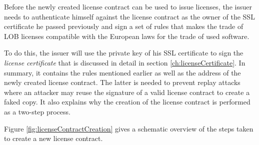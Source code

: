 \documentclass[a4paper]{article}
\begin{document}
Before the newly created license contract can be used to issue licenses, the issuer needs to authenticate himself against the license contract as the owner of the SSL certificate he passed previously and sign a set of rules that makes the trade of LOB licenses compatible with the European laws for the trade of used software.

To do this, the issuer will use the private key of his SSL certificate to sign the \emph{license certificate} that is discussed in detail in section \ref{ch:licenseCertificate}. In summary, it contains the rules mentioned earlier as well as the address of the newly created license contract. The latter is needed to prevent replay attacks where an attacker may reuse the signature of a valid license contract to create a faked copy. It also explains why the creation of the license contract is performed as a two-step process.

Figure \ref{fig:licenseContractCreation} gives a schematic overview of the steps taken to create a new license contract.
\end{document}

